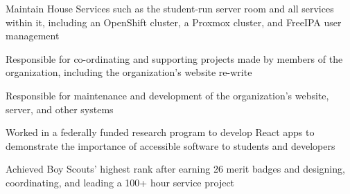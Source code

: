 \medskip


\medskip


\smallskip
\smallskip


\medskip
{}

Maintain House Services such as the student-run server room and all services within it, including an OpenShift cluster, a Proxmox cluster, and FreeIPA user management


Responsible for co-ordinating and supporting projects made by members of the organization, including the organization's website re-write


Responsible for maintenance and development of the organization's website, server, and other systems

Worked in a federally funded research program to develop React apps to demonstrate the importance of accessible software to students and developers


Achieved Boy Scouts' highest rank after earning 26 merit badges and designing, coordinating, and leading a 100+ hour service project




